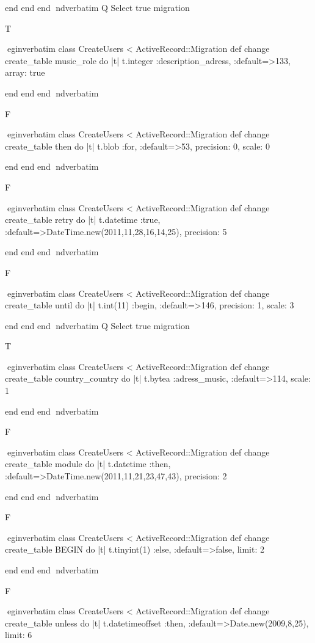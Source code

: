     end 
  end 
end
nd{verbatim}
Q
 Select true migration

T

egin{verbatim}
 class CreateUsers < ActiveRecord::Migration 
  def change 
    create_table music_role do |t| 
      t.integer :description_adress, :default=>133, array: true
    
    end 
  end 
end
nd{verbatim}

F

egin{verbatim}
 class CreateUsers < ActiveRecord::Migration 
  def change 
    create_table then do |t| 
      t.blob :for, :default=>53, precision: 0, scale: 0
    
    end 
  end 
end
nd{verbatim}

F

egin{verbatim}
 class CreateUsers < ActiveRecord::Migration 
  def change 
    create_table retry do |t| 
      t.datetime :true, :default=>DateTime.new(2011,11,28,16,14,25), precision: 5
    
    end 
  end 
end
nd{verbatim}

F

egin{verbatim}
 class CreateUsers < ActiveRecord::Migration 
  def change 
    create_table until do |t| 
      t.int(11) :begin, :default=>146, precision: 1, scale: 3
    
    end 
  end 
end
nd{verbatim}
Q
 Select true migration

T

egin{verbatim}
 class CreateUsers < ActiveRecord::Migration 
  def change 
    create_table country_country do |t| 
      t.bytea :adress_music, :default=>114, scale: 1
    
    end 
  end 
end
nd{verbatim}

F

egin{verbatim}
 class CreateUsers < ActiveRecord::Migration 
  def change 
    create_table module do |t| 
      t.datetime :then, :default=>DateTime.new(2011,11,21,23,47,43), precision: 2
    
    end 
  end 
end
nd{verbatim}

F

egin{verbatim}
 class CreateUsers < ActiveRecord::Migration 
  def change 
    create_table BEGIN do |t| 
      t.tinyint(1) :else, :default=>false, limit: 2
    
    end 
  end 
end
nd{verbatim}

F

egin{verbatim}
 class CreateUsers < ActiveRecord::Migration 
  def change 
    create_table unless do |t| 
      t.datetimeoffset :then, :default=>Date.new(2009,8,25), limit: 6
    
